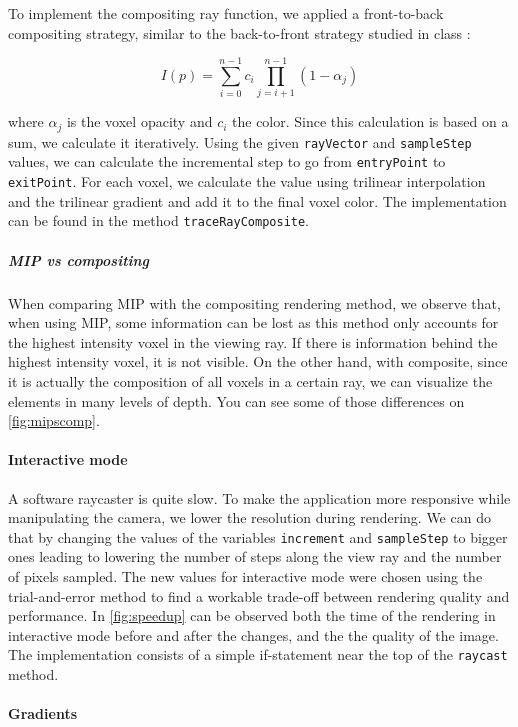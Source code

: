 \documentclass[a4paper]{article}
\begin{document}
To implement the compositing ray function, we applied a front-to-back compositing strategy, similar to the back-to-front strategy studied in class \citep{2imv20_2}:

$$I(p)=\sum^{n-1}_{i=0}c_i\prod^{n-1}_{j=i+1}(1-\alpha_j)$$

where $\alpha_j$ is the voxel opacity and $c_i$ the color. Since this calculation is based on a sum, we calculate it iteratively. Using the given {\tt rayVector} and {\tt sampleStep} values, we can calculate the incremental step to go from {\tt entryPoint} to {\tt exitPoint}. For each voxel, we calculate the value using trilinear interpolation and the trilinear gradient and add it to the final voxel color. The implementation can be found in the method {\tt traceRayComposite}.

\subparagraph{MIP vs compositing}

When comparing MIP with the compositing rendering method, we observe that, when using MIP, some information can be lost as this method only accounts for the highest intensity voxel in the viewing ray. If there is information behind the highest intensity voxel, it is not visible. On the other hand, with composite, since it is actually the composition of all voxels in a certain ray, we can visualize the elements in many levels of depth. You can see some of those differences on \autoref{fig:mipscomp}.

\paragraph{Interactive mode}
\label{speed_up}

A software raycaster is quite slow. To make the application more responsive while manipulating the camera, we lower the resolution during rendering. We can do that by changing the values of the variables {\tt increment} and {\tt sampleStep} to bigger ones leading to lowering the number of steps along the view ray and the number of pixels sampled.  The new values for interactive mode were chosen using the trial-and-error method to find a workable trade-off between rendering quality and performance. In \autoref{fig:speedup} can be observed both the time of the rendering in interactive mode before and after the changes, and the the quality of the image. The implementation consists of a simple if-statement near the top of the {\tt raycast} method.

\paragraph{Gradients}
\label{subsec:gradients}
\end{document}
